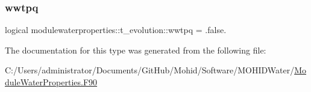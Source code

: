 \mbox{\label{structmodulewaterproperties_1_1t__evolution_a1a8dad274beda6ce6b589634627c21c0}} 
\subsubsection{\texorpdfstring{wwtpq}{wwtpq}}
{\footnotesize\ttfamily logical modulewaterproperties\+::t\+\_\+evolution\+::wwtpq = .false.\hspace{0.3cm}{\ttfamily [private]}}



The documentation for this type was generated from the following file\+:\begin{DoxyCompactItemize}
\item 
C\+:/\+Users/administrator/\+Documents/\+Git\+Hub/\+Mohid/\+Software/\+M\+O\+H\+I\+D\+Water/\mbox{\hyperlink{_module_water_properties_8_f90}{Module\+Water\+Properties.\+F90}}\end{DoxyCompactItemize}
